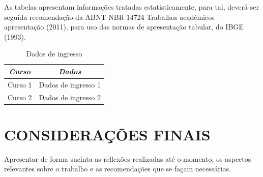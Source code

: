\documentclass{furgmpu}
\begin{document}
As tabelas apresentam informações tratadas estatisticamente, para tal, deverá ser seguida recomendação da ABNT NBR 14724 Trabalhos acadêmicos – apresentação (2011), para uso das normas de apresentação tabular, do IBGE (1993).

\begin{table}[ht]
	\centering
	\caption{Dados de ingresso}
	\begin{tabular}{cc}
		\toprule
		\textbf{\textit{Curso}} & \textbf{\textit{Dados}} \\
		\midrule
		Curso 1 & Dados de ingresso 1\\
		Curso 2 & Dados de ingresso 2\\
		\bottomrule
	\end{tabular}
	\label{tab:tabela}
\end{table}

\section{CONSIDERAÇÕES FINAIS}

Apresentar de forma sucinta as reflexões realizadas até o momento, os aspectos relevantes sobre o trabalho e as recomendações que se façam necessárias.

\titlespacing{\section}{0pt}{24pt}{12pt}
\end{document}
